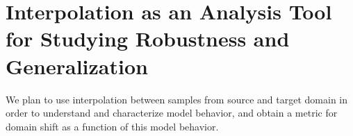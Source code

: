
\section{Interpolation as an Analysis Tool for Studying Robustness and Generalization}
We plan to use interpolation between samples from source and target domain in order to understand and characterize model behavior, and obtain a metric for domain shift as a function of this model behavior.

